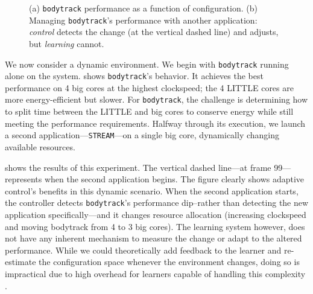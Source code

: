 \begin{figure}
\centering
  \subfloat[]
  {
    
    \label{fig:BODYTRACK_timeline}    
  }
  \caption{(a) \texttt{bodytrack} performance as a function of
    configuration. (b) Managing \texttt{bodytrack}'s performance with
    another application: \emph{control} detects the change (at the
    vertical dashed line) and adjusts, but \emph{learning} cannot. }
  \label{fig:control}
\end{figure}


We now consider a dynamic environment.  We begin with
\texttt{bodytrack} running alone on the system.
 shows \texttt{bodytrack}'s behavior.
It achieves the best performance on 4 big cores at the highest
clockspeed; the 4 LITTLE cores are more energy-efficient but slower.
For \texttt{bodytrack}, the challenge is determining how to split time
between the LITTLE and big cores to conserve energy while still
meeting the performance requirements. Halfway through its execution,
we launch a second application---\texttt{STREAM}---on a single big
core, dynamically changing available resources.

 shows the results of this experiment.
The vertical dashed line---at frame 99---represents when the second
application begins.  The figure clearly shows adaptive control's
benefits in this dynamic scenario.  When the second application
starts, the controller detects \texttt{bodytrack}'s performance
dip--rather than detecting the new application specifically---and it
changes resource allocation (increasing clockspeed and moving
bodytrack from 4 to 3 big cores).  The learning system however, does
not have any inherent mechanism to measure the change or adapt to the
altered performance.  While we could theoretically add feedback to the
learner and re-estimate the configuration space whenever the
environment changes, doing so is impractical due to high overhead for
learners capable of handling this complexity
\cite{Paragon,quasar,LEO}.


